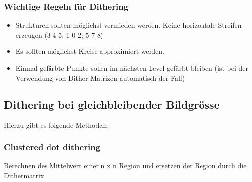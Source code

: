 \subsubsection{Wichtige Regeln für Dithering}
\begin{itemize}
    \item Strukturen sollten möglichst vermieden werden. Keine horizontale Streifen erzeugen (3 4 5; 1 0 2; 5 7 8)
    \item Es sollten möglichst Kreise approximiert werden.
    \item Einmal gefärbte Punkte sollen im nächsten Level gefärbt bleiben (ist bei der Verwendung von Dither-Matrizen automatisch der Fall)
\end{itemize}





\subsection{Dithering bei gleichbleibender Bildgrösse}
Hierzu gibt es folgende Methoden:
\subsubsection{Clustered dot dithering}
Berechnen des Mittelwert einer n x n Region und ersetzen der Region durch die Dithermatrix




